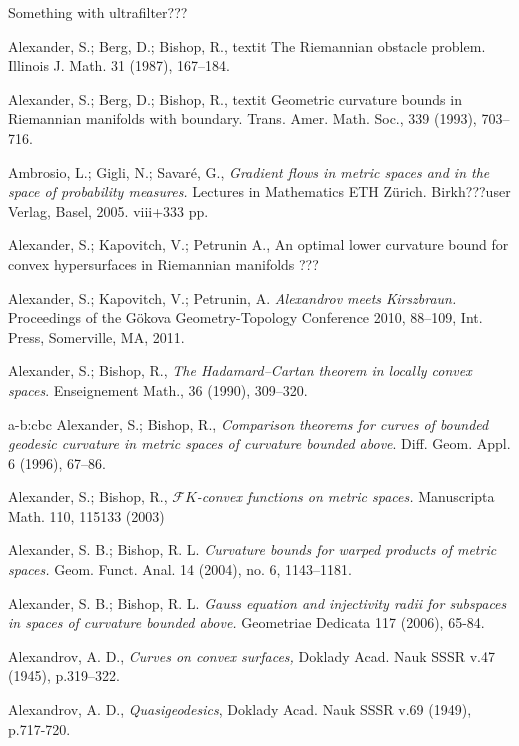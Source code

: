 \begin{thebibliography}{52}


 Something with  ultrafilter???

 Alexander, S.; Berg, D.; Bishop, R., textit{ The Riemannian obstacle problem}.
Illinois J. Math. 31 (1987), 167--184.

 Alexander, S.; Berg, D.; Bishop, R., textit{ Geometric curvature bounds in Riemannian manifolds with
  boundary}.
  Trans. Amer. Math. Soc., 339 (1993), 703--716.

 Ambrosio, L.; Gigli, N.; Savar\'e, G., \textit{Gradient flows in metric spaces and in the space of probability measures.} Lectures in Mathematics ETH Z\"urich. Birkh???user Verlag, Basel, 2005. viii+333 pp.

 Alexander, S.; Kapovitch, V.; Petrunin A., An optimal lower curvature bound for convex hypersurfaces in Riemannian manifolds ???

Alexander, S.; Kapovitch, V.; Petrunin, A.
\textit{Alexandrov meets Kirszbraun.} Proceedings of the G\"okova Geometry-Topology Conference 2010, 88--109, Int. Press, Somerville, MA, 2011. 

Alexander, S.; Bishop, R., \textit{The Hadamard--Cartan theorem in locally convex spaces}. Enseignement Math., 36 (1990), 309--320.

\bibitem
{a-b:cbc} Alexander, S.; Bishop, R., \textit{Comparison theorems for curves of bounded geodesic curvature
  in metric spaces of curvature bounded above}.
Diff. Geom. Appl. 6 (1996), 67--86.

 Alexander, S.; Bishop, R., \textit{$\mathcal F
K$-convex functions on metric spaces.} Manuscripta Math. 110, 115133 (2003)


 Alexander, S. B.; Bishop, R. L. \textit{Curvature bounds for warped products of metric spaces.}  Geom. Funct. Anal.  14  (2004),  no. 6, 1143--1181.

Alexander, S. B.; Bishop, R. L. \textit{Gauss equation and injectivity radii for subspaces in spaces of curvature bounded above.}  Geometriae Dedicata 117 (2006), 65-84.

 Alexandrov, A. D., \textit{Curves on convex surfaces,} Doklady Acad. Nauk SSSR v.47 (1945), p.319--322.

 Alexandrov, A. D., \textit{Quasigeodesics}, Doklady Acad. Nauk SSSR v.69 (1949),
p.717-720.


\end{thebibliography}
